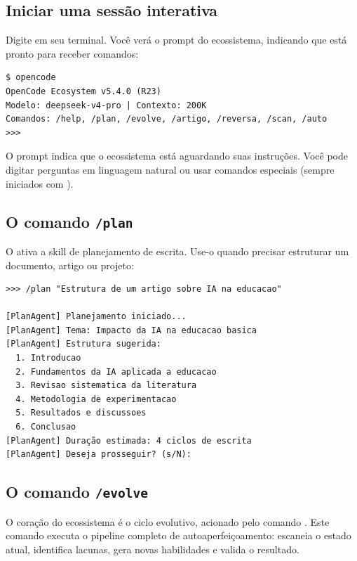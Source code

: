 \subsection{Iniciar uma sessão interativa}
\label{subsec:sessao-interativa}

Digite  em seu terminal. Você verá o prompt do
ecossistema, indicando que está pronto para receber comandos:

\begin{lstlisting}[style=bashstyle, caption={Iniciando sessão interativa},
label={lst:session}]
$ opencode
OpenCode Ecosystem v5.4.0 (R23)
Modelo: deepseek-v4-pro | Contexto: 200K
Comandos: /help, /plan, /evolve, /artigo, /reversa, /scan, /auto
>>> 
\end{lstlisting}

O prompt \codigo{>>>} indica que o ecossistema está aguardando suas
instruções. Você pode digitar perguntas em linguagem natural ou usar
comandos especiais (sempre iniciados com \codigo{/}).

\subsection{O comando \texttt{/plan}}
\label{subsec:comando-plan}

O  ativa a skill de planejamento de escrita. Use-o quando
precisar estruturar um documento, artigo ou projeto:

\begin{lstlisting}[style=bashstyle, caption={Usando o comando
\codigo{/plan}}, label={lst:plan}]
>>> /plan "Estrutura de um artigo sobre IA na educacao"

[PlanAgent] Planejamento iniciado...
[PlanAgent] Tema: Impacto da IA na educacao basica
[PlanAgent] Estrutura sugerida:
  1. Introducao
  2. Fundamentos da IA aplicada a educacao
  3. Revisao sistematica da literatura
  4. Metodologia de experimentacao
  5. Resultados e discussoes
  6. Conclusao
[PlanAgent] Duração estimada: 4 ciclos de escrita
[PlanAgent] Deseja prosseguir? (s/N):
\end{lstlisting}

\subsection{O comando \texttt{/evolve}}
\label{subsec:comando-evolve}

O coração do ecossistema é o ciclo evolutivo, acionado pelo comando
. Este comando executa o pipeline completo de
autoaperfeiçoamento: escaneia o estado atual, identifica lacunas, gera
novas habilidades e valida o resultado.

